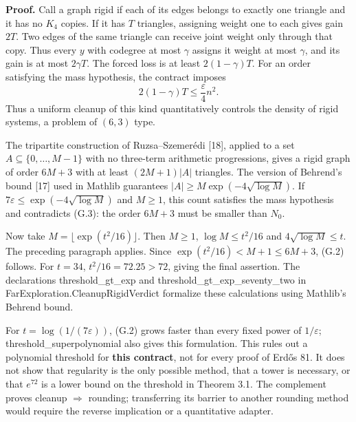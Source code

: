 \documentclass[english,11pt,a4paper]{article}
\begin{document}
\textbf{Proof.} Call a graph rigid if each of its edges belongs to exactly one triangle and it has no \(K_4\) copies. If it has \(T\) triangles, assigning weight one to each gives gain \(2T\). Two edges of the same triangle can receive joint weight only through that copy. Thus every \(y\) with codegree at most \(\gamma\) assigns it weight at most \(\gamma\), and its gain is at most \(2\gamma T\). The forced loss is at least \(2(1-\gamma)T\). For an order satisfying the mass hypothesis, the contract imposes \[
2(1-\gamma)T\le\frac{\varepsilon}{4}n^2.
\tag{G.3}
\] Thus a uniform cleanup of this kind quantitatively controls the density of rigid systems, a problem of \((6,3)\) type.

The tripartite construction of Ruzsa--Szemerédi {[}18{]}, applied to a set \(A\subseteq\{0,\ldots,M-1\}\) with no three-term arithmetic progressions, gives a rigid graph of order \(6M+3\) with at least \((2M+1)|A|\) triangles. The version of Behrend's bound {[}17{]} used in Mathlib guarantees \(|A|\ge M\exp(-4\sqrt{\log M})\). If \(7\varepsilon\le\exp(-4\sqrt{\log M})\) and \(M\ge1\), this count satisfies the mass hypothesis and contradicts (G.3): the order \(6M+3\) must be smaller than \(N_0\).

Now take \(M=\lfloor\exp(t^2/16)\rfloor\). Then \(M\ge1\), \(\log M\le t^2/16\) and \(4\sqrt{\log M}\le t\). The preceding paragraph applies. Since \(\exp(t^2/16)<M+1\le6M+3\), (G.2) follows. For \(t=34\), \(t^2/16=72.25>72\), giving the final assertion. The declarations {\ttfamily\small threshold\_\discretionary{\hbox{\ensuremath{\hookrightarrow}}}{}{}gt\_\discretionary{\hbox{\ensuremath{\hookrightarrow}}}{}{}exp} and {\ttfamily\small threshold\_\discretionary{\hbox{\ensuremath{\hookrightarrow}}}{}{}gt\_\discretionary{\hbox{\ensuremath{\hookrightarrow}}}{}{}exp\_\discretionary{\hbox{\ensuremath{\hookrightarrow}}}{}{}seventy\_\discretionary{\hbox{\ensuremath{\hookrightarrow}}}{}{}two} in {\ttfamily\small FarExplorati\discretionary{\hbox{\ensuremath{\hookrightarrow}}}{}{}on.\discretionary{\hbox{\ensuremath{\hookrightarrow}}}{}{}CleanupRigid\discretionary{\hbox{\ensuremath{\hookrightarrow}}}{}{}Verdict} formalize these calculations using Mathlib's Behrend bound.

For \(t=\log(1/(7\varepsilon))\), (G.2) grows faster than every fixed power of \(1/\varepsilon\); {\ttfamily\small threshold\_\discretionary{\hbox{\ensuremath{\hookrightarrow}}}{}{}superpolynom\discretionary{\hbox{\ensuremath{\hookrightarrow}}}{}{}ial} also gives this formulation. This rules out a polynomial threshold for \textbf{this contract}, not for every proof of Erdős 81. It does not show that regularity is the only possible method, that a tower is necessary, or that \(e^{72}\) is a lower bound on the threshold in Theorem 3.1. The complement proves cleanup \(\Rightarrow\) rounding; transferring its barrier to another rounding method would require the reverse implication or a quantitative adapter.
\end{document}
